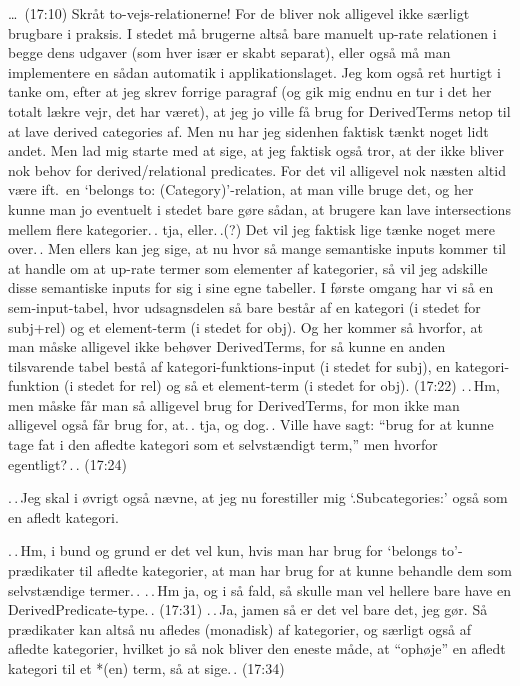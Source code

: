 \documentclass{report}
\begin{document}
\ldots\ (17:10) Skråt to-vejs-relationerne! For de bliver nok alligevel ikke særligt brugbare i praksis. I stedet må brugerne altså bare manuelt up-rate relationen i begge dens udgaver (som hver især er skabt separat), eller også må man implementere en sådan automatik i applikationslaget. Jeg kom også ret hurtigt i tanke om, efter at jeg skrev forrige paragraf (og gik mig endnu en tur i det her totalt lækre vejr, det har været), at jeg jo ville få brug for DerivedTerms netop til at lave derived categories af. Men nu har jeg sidenhen faktisk tænkt noget lidt andet. Men lad mig starte med at sige, at jeg faktisk også tror, at der ikke bliver nok behov for derived/relational predicates. For det vil alligevel nok næsten altid være ift.\ en `belongs to: (Category)'-relation, at man ville bruge det, og her kunne man jo eventuelt i stedet bare gøre sådan, at brugere kan lave intersections mellem flere kategorier.\,. tja, eller.\,.(?) Det vil jeg faktisk lige tænke noget mere over.\,. Men ellers kan jeg sige, at nu hvor så mange semantiske inputs kommer til at handle om at up-rate termer som elementer af kategorier, så vil jeg adskille disse semantiske inputs for sig i sine egne tabeller. I første omgang har vi så en sem-input-tabel, hvor udsagnsdelen så bare består af en kategori (i stedet for subj+rel) og et element-term (i stedet for obj). Og her kommer så hvorfor, at man måske alligevel ikke behøver DerivedTerms, for så kunne en anden tilsvarende tabel bestå af kategori-funktions-input (i stedet for subj), en kategori-funktion (i stedet for rel) og så et element-term (i stedet for obj). (17:22) .\,.\,Hm, men måske får man så alligevel brug for DerivedTerms, for mon ikke man alligevel også får brug for, at.\,. tja, og dog.\,. Ville have sagt: ``brug for at kunne tage fat i den afledte kategori som et selvstændigt term,'' men hvorfor egentligt?\,.\,. (17:24)

.\,.\,Jeg skal i øvrigt også nævne, at jeg nu forestiller mig `.Subcategories:' også som en afledt kategori. 

.\,.\,Hm, i bund og grund er det vel kun, hvis man har brug for `belongs to'-prædikater til afledte kategorier, at man har brug for at kunne behandle dem som selvstændige termer.\,. .\,.\,Hm ja, og i så fald, så skulle man vel hellere bare have en DerivedPredicate-type.\,. (17:31) .\,.\,Ja, jamen så er det vel bare det, jeg gør. Så prædikater kan altså nu afledes (monadisk) af kategorier, og særligt også af afledte kategorier, hvilket jo så nok bliver den eneste måde, at ``ophøje'' en afledt kategori til et *(en) term, så at sige.\,. (17:34)
\end{document}
